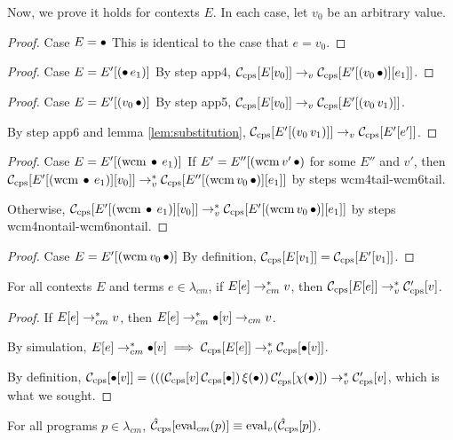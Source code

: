 Now, we prove it holds for contexts $E$. In each case, let $v_0$ be an arbitrary value.
\begin{proof}{Case $E=\bullet$}
This is identical to the case that $e=v_0$.
\end{proof}

\begin{proof}{Case $E=E'[(\bullet\,e_1)]$}
By step app4, $\mathcal{C}_{\mathrm{cps}}[E[v_0]]\rightarrow_v\mathcal{C}_{\mathrm{cps}}[E'[(v_0\,\bullet)][e_1]]$.
\end{proof}

\begin{proof}{Case $E=E'[(v_0\,\bullet)]$}
By step app5, $\mathcal{C}_{\mathrm{cps}}[E[v_0]]\rightarrow_v\mathcal{C}_{\mathrm{cps}}[E'[(v_0\,v_1)]]$.

By step app6 and lemma \ref{lem:substitution}, $\mathcal{C}_{\mathrm{cps}}[E'[(v_0\,v_1)]]\rightarrow_v\mathcal{C}_{\mathrm{cps}}[E'[e']]$.
\end{proof}

\begin{proof}{Case $E=E'[(\mathrm{wcm}\,\bullet\,e_1)]$}
If $E'=E''[(\mathrm{wcm}\,v'\,\bullet)$ for some $E''$ and $v'$, then $\mathcal{C}_{\mathrm{cps}}[E'[(\mathrm{wcm}\,\bullet\,e_1)][v_0]]\rightarrow_v^{*}\mathcal{C}_{\mathrm{cps}}[E''[(\mathrm{wcm}\,v_0\,\bullet)][e_1]]$ by steps wcm4tail-wcm6tail.

Otherwise, $\mathcal{C}_{\mathrm{cps}}[E'[(\mathrm{wcm}\,\bullet\,e_1)][v_0]]\rightarrow_v^{*}\mathcal{C}_{\mathrm{cps}}[E'[(\mathrm{wcm}\,v_0\,\bullet)][e_1]]$ by steps wcm4nontail-wcm6nontail.
\end{proof}

\begin{proof}{Case $E=E'[(\mathrm{wcm}\,v_0\,\bullet)]$}
By definition, $\mathcal{C}_{\mathrm{cps}}[E[v_1]]=\mathcal{C}_{\mathrm{cps}}[E'[v_1]]$.
\end{proof}

\begin{lemma}
\label{lem:great}
For all contexts $E$ and terms $e\in\lambda_{cm}$, if $E[e]\rightarrow_{cm}^{*} v$, then $\mathcal{C}_{\mathrm{cps}}[E[e]]\rightarrow_v^{*}\mathcal{C}'_{\mathrm{cps}}[v]$.
\end{lemma}

\begin{proof}
If $E[e]\rightarrow_{cm}^{*} v$, then $E[e]\rightarrow_{cm}^{*}\bullet[v]\rightarrow_{cm} v$.

By simulation, $E[e]\rightarrow_{cm}^{*}\bullet[v]\implies\mathcal{C}_{\mathrm{cps}}[E[e]]\rightarrow_v^{*}\mathcal{C}_{\mathrm{cps}}[\bullet[v]]$.

By definition, $\mathcal{C}_{\mathrm{cps}}[\bullet[v]]=(((\mathcal{C}_{\mathrm{cps}}[v]\,\mathcal{C}_{\mathrm{cps}}[\bullet])\,\xi(\bullet))\,\mathcal{C}'_{\mathrm{cps}}[\chi(\bullet)])\rightarrow_v^{*}\mathcal{C}'_{\mathrm{cps}}[v]$, which is what we sought.
\end{proof}

\begin{theorem}
For all programs $p\in\lambda_{cm}$, $\hat{\mathcal{C}}_{\mathrm{cps}}[\mathrm{eval}_{cm}(p)]\equiv\mathrm{eval}_{v}(\hat{\mathcal{C}}_{\mathrm{cps}}[p])$.
\end{theorem}


